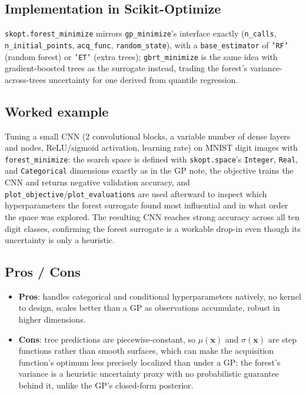 \documentclass[conference]{IEEEtran}
\begin{document}
\subsection*{Implementation in Scikit-Optimize}
\texttt{skopt.forest\_minimize} mirrors \texttt{gp\_minimize}'s interface exactly (\texttt{n\_calls}, \texttt{n\_initial\_points}, \texttt{acq\_func}, \texttt{random\_state}), with a \texttt{base\_estimator} of \texttt{'RF'} (random forest) or \texttt{'ET'} (extra trees); \texttt{gbrt\_minimize} is the same idea with gradient-boosted trees as the surrogate instead, trading the forest's variance-across-trees uncertainty for one derived from quantile regression.

\subsection*{Worked example}
Tuning a small CNN (2 convolutional blocks, a variable number of dense layers and nodes, ReLU/sigmoid activation, learning rate) on MNIST digit images with \texttt{forest\_minimize}: the search space is defined with \texttt{skopt.space}'s \texttt{Integer}, \texttt{Real}, and \texttt{Categorical} dimensions exactly as in the GP note, the objective trains the CNN and returns negative validation accuracy, and \texttt{plot\_objective}/\texttt{plot\_evaluations} are used afterward to inspect which hyperparameters the forest surrogate found most influential and in what order the space was explored. The resulting CNN reaches strong accuracy across all ten digit classes, confirming the forest surrogate is a workable drop-in even though its uncertainty is only a heuristic.

\subsection*{Pros / Cons}
\begin{itemize}
    \item \textbf{Pros}: handles categorical and conditional hyperparameters natively, no kernel to design, scales better than a GP as observations accumulate, robust in higher dimensions.
    \item \textbf{Cons}: tree predictions are piecewise-constant, so $\mu(\mathbf{x})$ and $\sigma(\mathbf{x})$ are step functions rather than smooth surfaces, which can make the acquisition function's optimum less precisely localized than under a GP; the forest's variance is a heuristic uncertainty proxy with no probabilistic guarantee behind it, unlike the GP's closed-form posterior.
\end{itemize}
\end{document}
